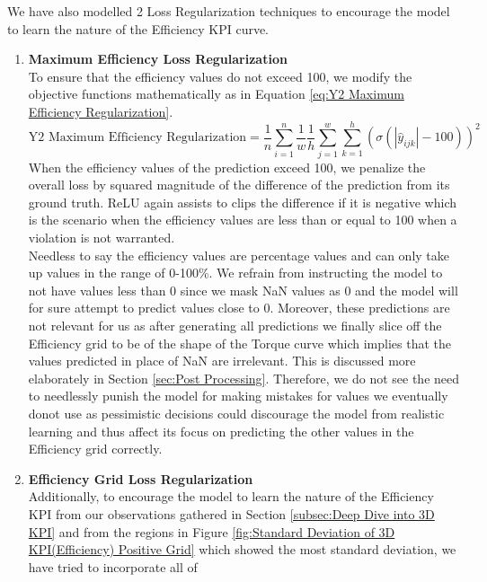 \documentclass{report} %
\begin{document}
We have also modelled 2 Loss Regularization techniques to encourage the model to learn the nature of the Efficiency \ac{KPI} curve.
\begin{enumerate}
\item \textbf{Maximum Efficiency Loss Regularization} \\
To ensure that the efficiency values do not exceed 100, we modify the objective functions mathematically as in Equation \ref{eq:Y2 Maximum Efficiency Regularization}.
\begin{equation}
\text{Y2 Maximum Efficiency Regularization} = \frac{1}{n} \sum_{i=1}^{n}\frac{1}{w} \frac{1}{h} \sum_{j=1}^{w} \sum_{k=1}^{h}\left(\sigma(|\hat{y}_{ijk}| - 100)\right)^2 
\label{eq:Y2 Maximum Efficiency Regularization}
\end{equation} 
\vspace{0.2cm} %
When the efficiency values of the prediction exceed 100, we penalize the overall loss by squared magnitude of the difference of the prediction from its ground truth.
\ac{ReLU} again assists to clips the difference if it is negative which is the scenario when the efficiency values are less than or equal to 100 when a violation is not warranted. \\
Needless to say the efficiency values are percentage values and can only take up values in the range of 0-100\%.
We refrain from instructing the model to not have values less than 0 since we mask \ac{NaN} values as 0 and the model will for sure attempt to predict values close to 0.
Moreover, these predictions are not relevant for us as after generating all predictions we finally slice off the Efficiency grid to be of the shape of the Torque curve 
which implies that the values predicted in place of \ac{NaN} are irrelevant. This is discussed more elaborately in Section \ref{sec:Post Processing}.
Therefore, we do not see the need to needlessly punish the model for making mistakes for values we eventually donot use as pessimistic decisions could discourage the model 
from realistic learning and thus affect its focus on predicting the other values in the Efficiency grid correctly.
\item \textbf{Efficiency Grid Loss Regularization} \\
Additionally, to encourage the model to learn the nature of the Efficiency \ac{KPI} from our observations gathered in Section \ref{subsec:Deep Dive into 3D KPI} and from 
the regions in Figure \ref{fig:Standard Deviation of 3D KPI(Efficiency) Positive Grid} which showed the most standard deviation, we have tried to incorporate all of 

\end{enumerate}
\end{document}
